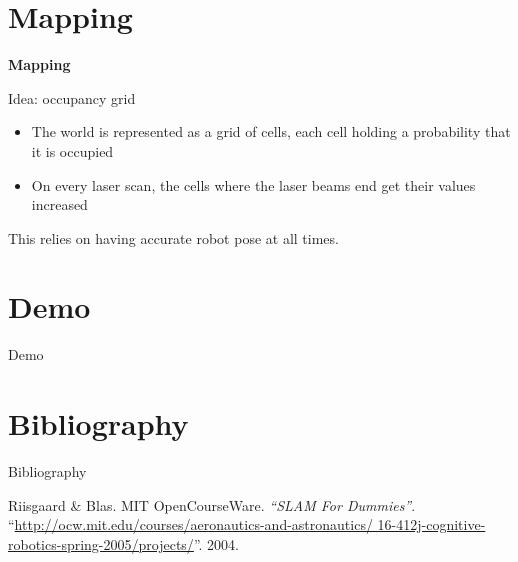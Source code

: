 \documentclass[xcolor=dvipsnames]{beamer}
\begin{document}
  \section{Mapping}
  \begin{frame}{\bf Mapping}

    Idea: occupancy grid

    \begin{itemize}
    \item The world is represented as a grid of cells, each cell holding a
          probability that it is occupied
    \item On every laser scan, the cells where the laser beams end get their
          values increased
    \end{itemize}
    \vspace{1cm}

    This relies on having accurate robot pose at all times.
  \end{frame}
  
  \section{Demo}
  \begin{frame}{Demo}
    
  \end{frame}
  
  \section{Bibliography}
  \begin{frame}{Bibliography}
    \begin{thebibliography}{3}

     Riisgaard \& Blas. MIT OpenCourseWare.
      \newblock \emph{``SLAM For Dummies''}.
      \newblock
      ``\url{http://ocw.mit.edu/courses/aeronautics-and-astronautics/
        16-412j-cognitive-robotics-spring-2005/projects/}''. 2004.
      
    \end{thebibliography}
  \end{frame}
  
\end{document}
